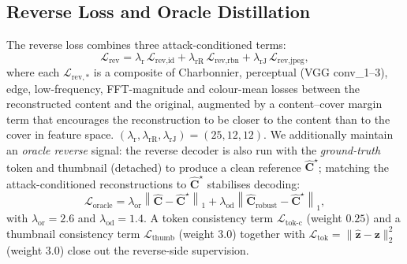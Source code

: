 \documentclass[conference]{IEEEtran}
\begin{document}
\subsection{Reverse Loss and Oracle Distillation}
\label{sec:rev}
The reverse loss combines three attack-conditioned terms:
\begin{equation}
    \mathcal{L}_{\text{rev}} = \lambda_{\text{r}}\,\mathcal{L}_{\text{rev,id}} + \lambda_{\text{rR}}\,\mathcal{L}_{\text{rev,rbn}} + \lambda_{\text{rJ}}\,\mathcal{L}_{\text{rev,jpeg}},
    \label{eq:rev}
\end{equation}
where each $\mathcal{L}_{\text{rev},*}$ is a composite of Charbonnier, perceptual (VGG conv\_1--3), edge, low-frequency, FFT-magnitude and colour-mean losses between the reconstructed content and the original, augmented by a content--cover margin term that encourages the reconstruction to be closer to the content than to the cover in feature space. $(\lambda_{\text{r}},\lambda_{\text{rR}},\lambda_{\text{rJ}})=(25,12,12)$. We additionally maintain an \emph{oracle reverse} signal: the reverse decoder is also run with the \emph{ground-truth} token and thumbnail (detached) to produce a clean reference $\hat{\mathbf{C}}^{\star}$; matching the attack-conditioned reconstructions to $\hat{\mathbf{C}}^{\star}$ stabilises decoding:
\begin{equation}
    \mathcal{L}_{\text{oracle}} = \lambda_{\text{or}}\!\left\|\hat{\mathbf{C}}-\hat{\mathbf{C}}^{\star}\right\|_1
    + \lambda_{\text{od}}\!\left\|\hat{\mathbf{C}}_{\text{robust}}-\hat{\mathbf{C}}^{\star}\right\|_1, \label{eq:oracle}
\end{equation}
with $\lambda_{\text{or}}\!=\!2.6$ and $\lambda_{\text{od}}\!=\!1.4$. A token consistency term $\mathcal{L}_{\text{tok-c}}$ (weight $0.25$) and a thumbnail consistency term $\mathcal{L}_{\text{thumb}}$ (weight $3.0$) together with $\mathcal{L}_{\text{tok}}=\|\hat{\mathbf{z}}-\mathbf{z}\|_2^2$ (weight $3.0$) close out the reverse-side supervision.
\end{document}
